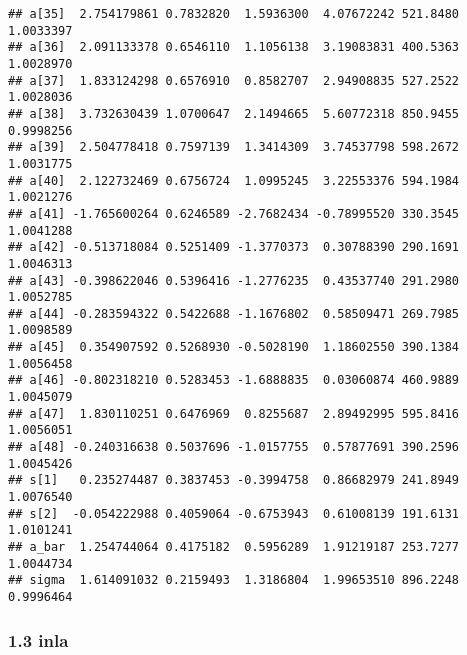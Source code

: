 \documentclass[
]{article}
\begin{document}
\begin{verbatim}
## a[35]  2.754179861 0.7832820  1.5936300  4.07672242 521.8480 1.0033397
## a[36]  2.091133378 0.6546110  1.1056138  3.19083831 400.5363 1.0028970
## a[37]  1.833124298 0.6576910  0.8582707  2.94908835 527.2522 1.0028036
## a[38]  3.732630439 1.0700647  2.1494665  5.60772318 850.9455 0.9998256
## a[39]  2.504778418 0.7597139  1.3414309  3.74537798 598.2672 1.0031775
## a[40]  2.122732469 0.6756724  1.0995245  3.22553376 594.1984 1.0021276
## a[41] -1.765600264 0.6246589 -2.7682434 -0.78995520 330.3545 1.0041288
## a[42] -0.513718084 0.5251409 -1.3770373  0.30788390 290.1691 1.0046313
## a[43] -0.398622046 0.5396416 -1.2776235  0.43537740 291.2980 1.0052785
## a[44] -0.283594322 0.5422688 -1.1676802  0.58509471 269.7985 1.0098589
## a[45]  0.354907592 0.5268930 -0.5028190  1.18602550 390.1384 1.0056458
## a[46] -0.802318210 0.5283453 -1.6888835  0.03060874 460.9889 1.0045079
## a[47]  1.830110251 0.6476969  0.8255687  2.89492995 595.8416 1.0056051
## a[48] -0.240316638 0.5037696 -1.0157755  0.57877691 390.2596 1.0045426
## s[1]   0.235274487 0.3837453 -0.3994758  0.86682979 241.8949 1.0076540
## s[2]  -0.054222988 0.4059064 -0.6753943  0.61008139 191.6131 1.0101241
## a_bar  1.254744064 0.4175182  0.5956289  1.91219187 253.7277 1.0044734
## sigma  1.614091032 0.2159493  1.3186804  1.99653510 896.2248 0.9996464
\end{verbatim}

\hypertarget{inla-2}{%
\subsubsection{1.3 inla}\label{inla-2}}
\end{document}
